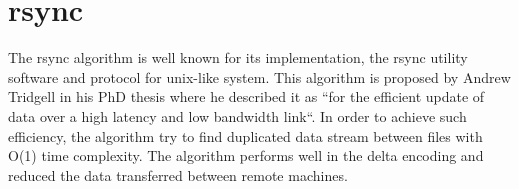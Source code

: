 \section{rsync}
    
    The rsync algorithm is well known for its implementation, the rsync utility software and protocol for unix-like system. This algorithm is proposed by Andrew Tridgell in his PhD thesis where he described it as “for the efficient update of data over a high latency and low bandwidth link“. In order to achieve such efficiency, the algorithm try to find duplicated data stream between files with O(1) time complexity. The algorithm performs well in the delta encoding and reduced the data transferred between remote machines.
